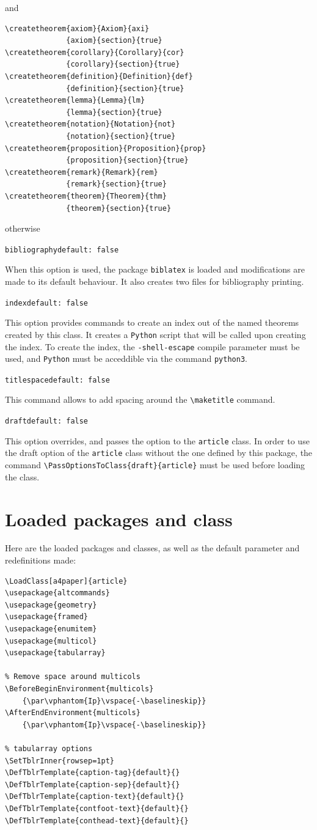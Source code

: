 \documentclass[12pt, babellanguage=british, titlespace, defaulttheorems]{altarticle}
\newcommand{\optionline}[2][]{\par\medskip\hspace*{-.75cm}\texttt{#2}\hfill\if\relax\detokenize{#1}\relax\else\texttt{default:~#1}\fi\par}
\begin{document}
and
\begin{verbatim}
\createtheorem{axiom}{Axiom}{axi}
              {axiom}{section}{true}
\createtheorem{corollary}{Corollary}{cor}
              {corollary}{section}{true}
\createtheorem{definition}{Definition}{def}
              {definition}{section}{true}
\createtheorem{lemma}{Lemma}{lm}
              {lemma}{section}{true}
\createtheorem{notation}{Notation}{not}
              {notation}{section}{true}
\createtheorem{proposition}{Proposition}{prop}
              {proposition}{section}{true}
\createtheorem{remark}{Remark}{rem}
              {remark}{section}{true}
\createtheorem{theorem}{Theorem}{thm}
              {theorem}{section}{true}
\end{verbatim}
otherwise
\optionline[false]{bibliography}When this option is used, the package \texttt{biblatex} is loaded and modifications are made to its default behaviour. It also creates two files for bibliography printing.
\optionline[false]{index}This option provides commands to create an index out of the named theorems created by this class. It creates a \texttt{Python} script that will be called upon creating the index. To create the index, the \texttt{-shell-escape} compile parameter must be used, and \texttt{Python} must be acceddible via the command \texttt{python3}.
\optionline[false]{titlespace}This command allows to add spacing around the \texttt{\textbackslash maketitle} command.
\optionline[false]{draft}This option overrides, and passes the option to the \texttt{article} class. In order to use the draft option of the \texttt{article} class without the one defined by this package, the command \texttt{\textbackslash PassOptionsToClass\{draft\}\{article\}} must be used before loading the class.
\section{Loaded packages and class}
Here are the loaded packages and classes, as well as the default parameter and redefinitions made:
\begin{verbatim}
\LoadClass[a4paper]{article}
\usepackage{altcommands}
\usepackage{geometry}
\usepackage{framed}
\usepackage{enumitem}
\usepackage{multicol}
\usepackage{tabularray}

% Remove space around multicols
\BeforeBeginEnvironment{multicols}
    {\par\vphantom{Ip}\vspace{-\baselineskip}}
\AfterEndEnvironment{multicols}
    {\par\vphantom{Ip}\vspace{-\baselineskip}}

% tabularray options
\SetTblrInner{rowsep=1pt}
\DefTblrTemplate{caption-tag}{default}{}
\DefTblrTemplate{caption-sep}{default}{}
\DefTblrTemplate{caption-text}{default}{}
\DefTblrTemplate{contfoot-text}{default}{}
\DefTblrTemplate{conthead-text}{default}{}
\end{verbatim}
\end{document}
